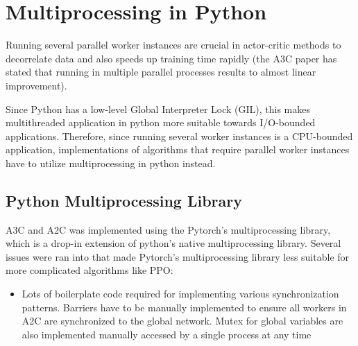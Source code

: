 \documentclass[11pt]{article} %
\begin{document}
\section{Multiprocessing in Python}
Running several parallel worker instances are crucial in actor-critic methods to decorrelate data and also speeds up training time rapidly (the A3C paper has stated that running in multiple parallel processes results to almost linear improvement).

Since Python has a low-level Global Interpreter Lock (GIL), this makes multithreaded application in python more suitable towards I/O-bounded applications. Therefore, since running several worker instances is a CPU-bounded application, implementations of algorithms that require parallel worker instances have to utilize multiprocessing in python instead.

\subsection{Python Multiprocessing Library}
A3C and A2C was implemented using the Pytorch's multiprocessing library, which is a drop-in extension of python's native multiprocessing library. Several issues were ran into that made Pytorch's multiprocessing library less suitable for more complicated algorithms like PPO:
\begin{itemize}
    \item Lots of boilerplate code required for implementing various synchronization patterns. Barriers have to be manually implemented to ensure all workers in A2C are synchronized to the global network. Mutex for global variables are also implemented manually accessed by a single process at any time
\end{itemize}
\newpage


\end{document}

